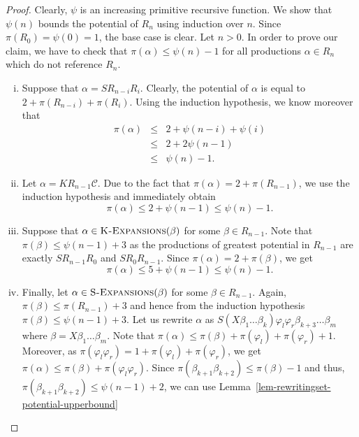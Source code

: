 \documentclass[11pt,a4paper]{amsart}
\theoremstyle{definition}
\newcommand{\KExpansions}[1]{\textsc{K-Expansions}(#1)}
\newcommand{\SExpansions}[1]{\textsc{S-Expansions}(#1)}
\newcommand{\potential}[1]{\pi(#1)}
\begin{document}
\begin{proof}
    Clearly, $\psi$ is an increasing primitive recursive function.
    We show that $\psi(n)$ bounds the potential of $R_n$ using induction over $n$.
    Since $\potential{R_0} = \psi(0) = 1$, the base case is clear.
    Let $n > 0$. In order to prove our claim, we have to check that $\potential{\alpha} \leq \psi(n) - 1$ for all productions $\alpha \in R_n$ which do not reference $R_n$.
     \begin{enumerate}[(i)]
     \item Suppose that $\alpha = S R_{n-i} R_i$. Clearly, the potential of $\alpha$ is equal to $2 + \potential{R_{n-i}} + \potential{R_i}$. Using the induction hypothesis, we know moreover that
     \begin{eqnarray*}
     \potential{\alpha} &\leq& 2 + \psi(n-i) + \psi(i)\\
     &\leq& 2 + 2 \psi(n-1)\\
     &\leq& \psi(n) - 1.
     \end{eqnarray*}
     \item Let $\alpha = K R_{n-1} \mathcal{C}$. Due to the fact that $\potential{\alpha} = 2 + \potential{R_{n-1}}$, we use the induction hypothesis and immediately obtain \[\potential{\alpha} \leq 2 + \psi(n-1) \leq \psi(n) - 1.\]
     \item Suppose that $\alpha \in \KExpansions{\beta}$ for some $\beta \in R_{n-1}$. Note that $\potential{\beta} \leq \psi(n-1) + 3$ as the productions of greatest potential in $R_{n-1}$ are exactly $S R_{n-1} R_0$ and $S R_0 R_{n-1}$. Since $\potential{\alpha} = 2 + \potential{\beta}$, we get
     \[ \potential{\alpha} \leq 5 + \psi(n-1) \leq \psi(n) - 1. \]
     \item Finally, let $\alpha \in \SExpansions{\beta}$ for some $\beta \in R_{n-1}$. Again, $\potential{\beta} \leq \potential{R_{n-1}} + 3$ and hence from the induction hypothesis $\potential{\beta} \leq \psi(n-1) + 3$. Let us rewrite $\alpha$ as $S(X \beta_1 \ldots \beta_k) \varphi_l \varphi_r \beta_{k+3} \ldots \beta_m$ where
     $\beta = X \beta_1 \ldots \beta_m$. Note that
     $\potential{\alpha} \leq \potential{\beta} + \potential{\varphi_l} + \potential{\varphi_r} + 1$. Moreover, as $\potential{\varphi_l \varphi_r} = 1 + \potential{\varphi_l} + \potential{\varphi_r}$, we get
     $ \potential{\alpha} \leq \potential{\beta} + \potential{\varphi_l \varphi_r}$.
     Since $\potential{\beta_{k+1} \beta_{k+2}} \leq \potential{\beta} - 1$ and thus, $\potential{\beta_{k+1} \beta_{k+2}} \leq \psi(n-1) + 2$, we can use Lemma~\ref{lem-rewritingset-potential-upperbound}

\end{enumerate}
\end{proof}
\end{document}
